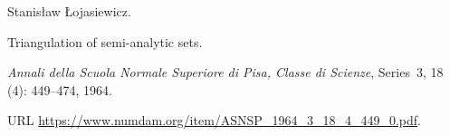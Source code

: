 Stanis{\l}aw \L{}ojasiewicz.

\newblock Triangulation of semi-analytic sets.

\newblock \emph{Annali della Scuola Normale Superiore di Pisa, Classe di
  Scienze}, Series~3, 18 (4): 449--474, 1964.

\newblock URL \url{https://www.numdam.org/item/ASNSP_1964_3_18_4_449_0.pdf}.
